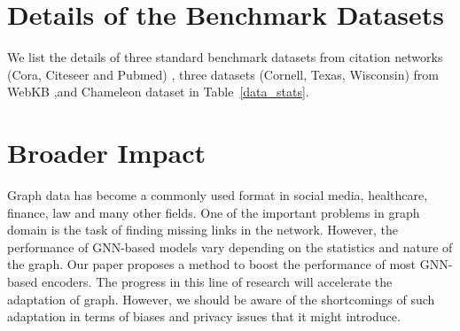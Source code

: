 \documentclass{article}
\begin{document}
\section{Details of the Benchmark Datasets}

We list the details of three standard benchmark datasets from citation networks (Cora, Citeseer and Pubmed) \citep{sen2008collective}, three datasets (Cornell, Texas, Wisconsin) from WebKB \citep{pei2020geom},and Chameleon dataset \citep{rozemberczki2021multi} in Table~\ref{data_stats}.


\begin{table*}[h]
\caption{Dataset statistics. Homophily Ratios are taken from \citep{ma2021homophily}.}
\label{data_stats}
\vskip 0.15in
\begin{center}
\begin{small}
\begin{sc}
\end{sc}
\end{small}
\end{center}
\vskip -0.1in
\end{table*}


\section{Broader Impact}\label{broader_impact}

Graph data has become a commonly used format in social media, healthcare, finance, law and many other fields. One of the important problems in graph domain is the task of finding missing links in the network. However, the performance of GNN-based models vary depending on the statistics and nature of the graph. Our paper proposes a method to boost the performance of most GNN-based encoders. The progress in this line of research will accelerate the adaptation of graph. However, we should be aware of the shortcomings of such adaptation in terms of biases and privacy issues that it might introduce.
\end{document}
